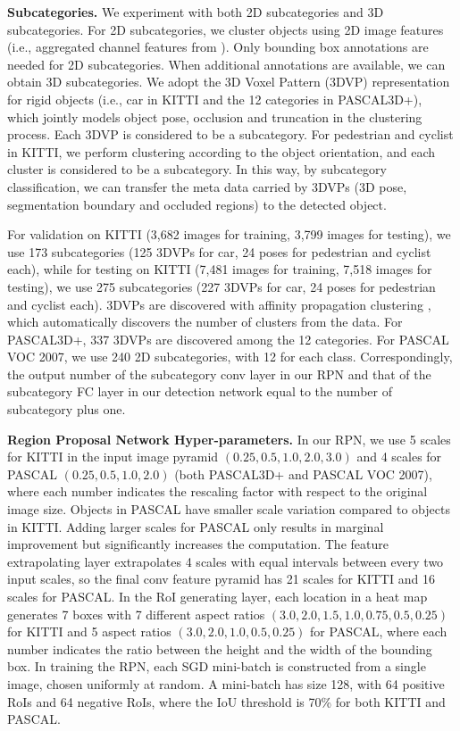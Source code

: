 \documentclass[10pt,twocolumn,letterpaper]{article}
\begin{document}
\noindent \textbf{Subcategories.} We experiment with both 2D subcategories and 3D subcategories. For 2D subcategories, we cluster objects using 2D image features (i.e., aggregated channel features from \cite{DollarPAMI14pyramids}). Only bounding box annotations are needed for 2D subcategories. When additional annotations are available, we can obtain 3D subcategories. We adopt the 3D Voxel Pattern (3DVP) representation \cite{xiang2015data} for rigid objects (i.e., car in KITTI and the 12 categories in PASCAL3D+), which jointly models object pose, occlusion and truncation in the clustering process. Each 3DVP is considered to be a subcategory. For pedestrian and cyclist in KITTI, we perform clustering according to the object orientation, and each cluster is considered to be a subcategory. In this way, by subcategory classification, we can transfer the meta data carried by 3DVPs (3D pose, segmentation boundary and occluded regions) to the detected object. 

For validation on KITTI (3,682 images for training, 3,799 images for testing), we use 173 subcategories (125 3DVPs for car, 24 poses for pedestrian and cyclist each), while for testing on KITTI (7,481 images for training, 7,518 images for testing), we use 275 subcategories (227 3DVPs for car, 24 poses for pedestrian and cyclist each). 3DVPs are discovered with affinity propagation clustering \cite{frey2007clustering}, which automatically discovers the number of clusters from the data.  For PASCAL3D+, 337 3DVPs are discovered among the 12 categories. For PASCAL VOC 2007, we use 240 2D subcategories, with 12 for each class. Correspondingly, the output number of the subcategory conv layer in our RPN and that of the subcategory FC layer in our detection network equal to the number of subcategory plus one.

\noindent \textbf{Region Proposal Network Hyper-parameters.} In our RPN, we use 5 scales for KITTI in the input image pyramid $(0.25, 0.5, 1.0, 2.0, 3.0)$ and 4 scales for PASCAL $(0.25, 0.5, 1.0, 2.0)$ (both PASCAL3D+ and PASCAL VOC 2007), where each number indicates the rescaling factor with respect to the original image size. Objects in PASCAL have smaller scale variation compared to objects in KITTI. Adding larger scales for PASCAL only results in marginal improvement but significantly increases the computation. The feature extrapolating layer extrapolates 4 scales with equal intervals between every two input scales, so the final conv feature pyramid has 21 scales for KITTI and 16 scales for PASCAL. In the RoI generating layer, each location in a heat map generates 7 boxes with 7 different aspect ratios $(3.0, 2.0, 1.5, 1.0, 0.75, 0.5, 0.25)$ for KITTI and 5 aspect ratios $(3.0, 2.0, 1.0, 0.5, 0.25)$ for PASCAL, where each number indicates the ratio between the height and the width of the bounding box. In training the RPN, each SGD mini-batch is constructed from a single image, chosen uniformly at random. A mini-batch has size 128, with 64 positive RoIs and 64 negative RoIs, where the IoU threshold is 70\% for both KITTI and PASCAL.
\end{document}
